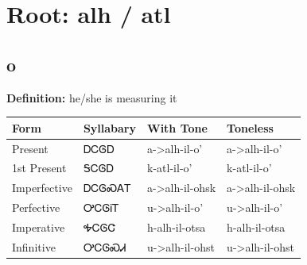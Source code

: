 \documentclass{article}%
\begin{document}
%
\normalsize%
\section*{Root: alh / atl}%
\subsection*{o}%
\textbf{Definition: }%
he/she is measuring it%
\\[0.5em]%
\begin{tabular}{|l|l|l|l|}%
\hline%
\textbf{Form}&\textbf{Syllabary}&\textbf{With Tone}&\textbf{Toneless}\\%
\hline%
Present&ᎠᏟᎶᎠ&a{-}>alh{-}il{-}o'&a{-}>alh{-}il{-}o'\\%
1st Present&ᎦᏟᎶᎠ&k{-}atl{-}il{-}o'&k{-}atl{-}il{-}o'\\%
Imperfective&ᎠᏟᎶᏍᎪᎢ&a{-}>alh{-}il{-}ohsk&a{-}>alh{-}il{-}ohsk\\%
Perfective&ᎤᏟᎶᎥᎢ&u{-}>alh{-}il{-}o'&u{-}>alh{-}il{-}o'\\%
Imperative&ᎭᏟᎶᏣ&h{-}alh{-}il{-}otsa&h{-}alh{-}il{-}otsa\\%
Infinitive&ᎤᏟᎶᏍᏗ&u{-}>alh{-}il{-}ohst&u{-}>alh{-}il{-}ohst\\%
\hline%
\end{tabular}%
\\[1em]%
\end{document}
